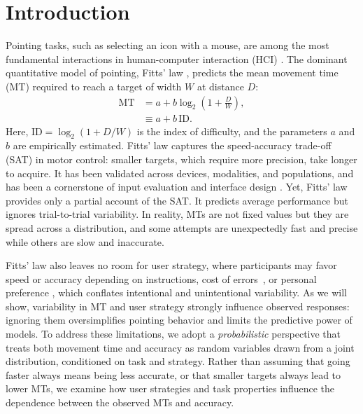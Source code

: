 \documentclass[acmlarge, manuscript,review]{acmart}
\newcommand{\mt}{\ensuremath{{\text{MT}}}\xspace}
\begin{document}
\section{Introduction\label{sec:introduction}}
Pointing tasks, such as selecting an icon with a mouse, are among the most fundamental interactions in human-computer interaction (HCI) \cite{card1978,soukoreff2004}.
The dominant quantitative model of pointing, Fitts' law \cite{fitts1954,soukoreff2004,gori2018tochi}, predicts the mean movement time (MT) required to reach a target of width \(W\) at distance \(D\):
\begin{align}
  \mt & = a + b \log_2 (1 + \tfrac{D}{W}), \label{eq:fitts} \\
  & \equiv a + b\,\text{ID}.
\end{align}
Here, $\text{ID}=\log_2 (1+D/W)$ is the index of difficulty, and the parameters $a$ and $b$ are empirically estimated.
Fitts' law captures the speed-accuracy trade-off (SAT) in motor control: smaller targets, which require more precision, take longer to acquire.
It has been validated across devices, modalities, and populations, and has been a cornerstone of input evaluation and interface design \cite{card1978,soukoreff2004}.
Yet, Fitts' law provides only a partial account of the SAT. It predicts average performance but ignores trial-to-trial variability. In reality, MTs are not fixed values but they are spread across a distribution, and some attempts are unexpectedly fast and precise while others are slow and inaccurate.

Fitts' law also leaves no room for user strategy, where participants may favor speed or accuracy depending on instructions, cost of errors~\cite{bertucco2015}, or personal preference \cite{zhai2004nominal,guiard2015}, which conflates intentional and unintentional variability. As we will show, variability in MT and user strategy strongly influence observed responses: ignoring them oversimplifies pointing behavior and limits the predictive power of models.
To address these limitations, we adopt a \textit{probabilistic} perspective that treats both movement time and accuracy as random variables drawn from a joint distribution, conditioned on task and strategy.
Rather than assuming that going faster always means being less accurate, or that smaller targets always lead to lower MTs, we examine how user strategies and task properties influence the dependence between the observed MTs and accuracy.
\end{document}

